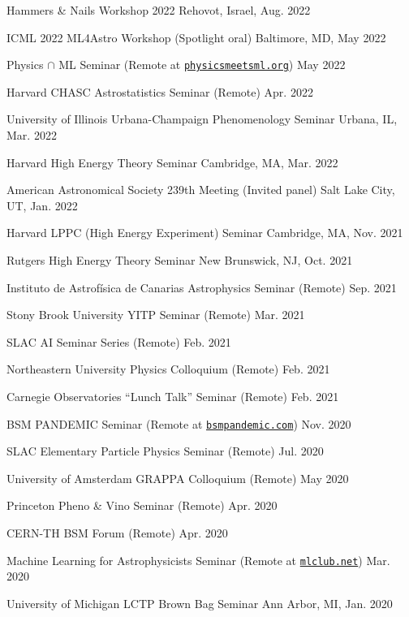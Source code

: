 \documentclass[letterpaper,11pt]{article}
\newenvironment{packed_itemize}{
\begin{itemize}[label=\raisebox{0.25ex}{\tiny$\bullet$}, topsep=0pt, partopsep=0pt]
  \setlength{\itemsep}{4.0pt}
  \setlength{\parskip}{0pt}
  \setlength{\parsep}{0pt}}{\end{itemize}
}
\begin{document}
\begin{packed_itemize}
  \item Hammers \& Nails Workshop 2022 \hfill Rehovot, Israel, Aug. 2022
  \item ICML 2022 ML4Astro Workshop (Spotlight oral) \hfill Baltimore, MD, May 2022
  \item Physics $\cap$ ML Seminar (Remote at \href{http://www.physicsmeetsml.org//}{\texttt{physicsmeetsml.org}}) \hfill May 2022
  \item Harvard CHASC Astrostatistics Seminar (Remote)  \hfill Apr. 2022
  \item University of Illinois Urbana-Champaign Phenomenology Seminar  \hfill Urbana, IL, Mar. 2022
  \item Harvard High Energy Theory Seminar \hfill Cambridge, MA, Mar. 2022
  \item American Astronomical Society 239th Meeting (Invited panel)  \hfill Salt Lake City, UT, Jan. 2022
  \item Harvard LPPC (High Energy Experiment) Seminar \hfill Cambridge, MA, Nov. 2021
  \item Rutgers High Energy Theory Seminar \hfill New Brunswick, NJ, Oct. 2021
  \item Instituto de Astrof\'{i}sica de Canarias Astrophysics Seminar (Remote) \hfill Sep. 2021
  \item Stony Brook University YITP Seminar (Remote) \hfill Mar. 2021
  \item SLAC AI Seminar Series (Remote) \hfill Feb. 2021
  \item Northeastern University Physics Colloquium (Remote) \hfill Feb. 2021
  \item Carnegie Observatories ``Lunch Talk'' Seminar (Remote) \hfill Feb. 2021
  \item BSM PANDEMIC Seminar  (Remote at \href{https://www.bsmpandemic.com/}{\texttt{bsmpandemic.com}}) \hfill Nov. 2020
  \item SLAC Elementary Particle Physics Seminar (Remote) \hfill Jul. 2020
  \item University of Amsterdam GRAPPA Colloquium (Remote) \hfill May 2020
  \item Princeton Pheno \& Vino Seminar (Remote) \hfill Apr. 2020
  \item CERN-TH BSM Forum (Remote) \hfill  Apr. 2020
  \item Machine Learning for Astrophysicists Seminar (Remote at \href{https://docs.google.com/document/d/1GGtE-YIuAWlmpKSr38_kyiF-Fklszhkh4FkiYWzBAho/pub}{\texttt{mlclub.net}}) \hfill  Mar. 2020
  \item University of Michigan LCTP Brown Bag Seminar \hfill Ann Arbor, MI, Jan. 2020

\end{packed_itemize}
\end{document}
